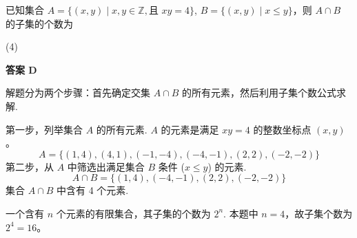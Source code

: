 \begin{choice}[topic={集合的交集与子集个数}]
已知集合 $A=\{(x,y) \mid x,y \in \mathbb{Z}, \text{且 } xy=4\}$, $B=\{(x,y) \mid x \le y\}$，则 $A \cap B$ 的子集的个数为
\begin{tasks}(4)
\end{tasks}
\end{choice}
\begin{choice-sol}
\textbf{答案 D}

解题分为两个步骤：首先确定交集 $A \cap B$ 的所有元素，然后利用子集个数公式求解.

第一步，列举集合 $A$ 的所有元素.
$A$ 的元素是满足 $xy=4$ 的整数坐标点 $(x,y)$。
\[ A = \{(1,4), (4,1), (-1,-4), (-4,-1), (2,2), (-2,-2)\} \]
第二步，从 $A$ 中筛选出满足集合 $B$ 条件 ($x \le y$) 的元素.
\[ A \cap B = \{(1,4), (-4,-1), (2,2), (-2,-2)\} \]
集合 $A \cap B$ 中含有 4 个元素.

一个含有 $n$ 个元素的有限集合，其子集的个数为 $2^n$.
本题中 $n=4$，故子集个数为 $2^4 = 16$。
\end{choice-sol}
